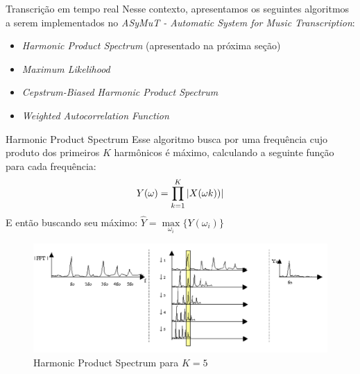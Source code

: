 \documentclass[final,hyperref={pdfpagelabels=false}]{beamer}
\begin{document}
\begin{frame}[t]
\begin{columns}[t]
\begin{column}{.465\textwidth}
\begin{block}{Transcrição em tempo real}
Nesse contexto, apresentamos os seguintes algoritmos a serem implementados no \emph{ASyMuT - Automatic System for Music Transcription}:

\begin{changemargin}{2cm}{2cm}
     \begin{itemize}
\item \emph{Harmonic Product Spectrum} (apresentado na próxima seção)
\item \emph{Maximum Likelihood}
\item \emph{Cepstrum-Biased Harmonic Product Spectrum}
\item \emph{Weighted Autocorrelation Function}
\end{itemize}
\end{changemargin}

\end{block}


\begin{block}{Harmonic Product Spectrum}
Esse algoritmo busca por uma frequência cujo produto dos primeiros $K$ harmônicos é máximo, calculando a seguinte função para cada frequência: $$Y(\omega) = \prod _{k=1}^{K} \abs{X(\omega k))}$$
E então buscando seu máximo: $\widehat{Y} = \max\limits_{\omega_i}\{Y(\omega_i)\}$

     \begin{figure}%
\centering
\includegraphics[width=0.85\linewidth]{hps2.png}
\caption{Harmonic Product Spectrum para $K=5$}
\end{figure}

\end{block}



\end{column}
\end{columns}
\end{frame}
\end{document}
